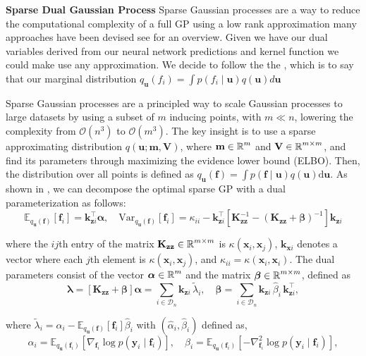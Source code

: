 \documentclass{article}
\newcommand{\mathbold}[1]{\bm{#1}}
\newcommand{\mbf}[1]{\mathbf{#1}}
\newcommand{\MV}{\mbf{V}}
\newcommand{\T}{\top}
\newcommand{\valpha}[0]{\mathbold{\alpha}}
\newcommand{\vbeta}[0]{\mathbold{\beta}}
\newcommand{\vlambda}[0]{\mathbold{\lambda}}
\newcommand{\vm}{\mbf{m}}
\newcommand{\vf}{\mbf{f}}
\newcommand{\vu}{\mbf{u}}
\newcommand{\vx}{\mbf{x}}
\newcommand{\vy}{\mbf{y}}
\newcommand{\MKzz}{\mbf{K}_{\mbf{z}\mbf{z}}}
\newcommand{\vkzi}{\mbf{k}_{\mbf{z}i}}
\newcommand{\vkzs}{\mbf{k}_{\mbf{z}i}}
\newcommand{\vk}{\mbf{k}}
\newcommand{\myexpect}{\mathbb{E}}
\begin{document}
\textbf{Sparse Dual Gaussian Process} Sparse Gaussian processes are a way to reduce the computational complexity of a full GP using a low rank approximation many approaches have been devised see \citet{quinonero2005unifying} for an overview. Given we have our dual variables derived from our neural network predictions and kernel function we could make use any approximation. We decide to follow the the \citep{titsias2009variational}, which is to say that our marginal distribution $q_{\vu}(f_i)  = \int p(f_i  \mid \vu) q(\vu)  d\vu$

Sparse Gaussian processes \citep{hensman2013gaussian} are a principled way to scale Gaussian processes to large datasets by using a subset of $m$ inducing points, with $m \ll n$,  lowering the complexity from $\mathcal{O}(n^3)$ to $\mathcal{O}(m^3)$. The key insight is to use a sparse approximating distribution $q(\vu; \vm, \MV)$, where $\vm \in \R^{m}$ and $\MV \in \R^{m \times m}$, and find its parameters through maximizing the evidence lower bound (ELBO). Then, the distribution over all points is defined as $q_{\vu}(\vf) = \int p(\vf \mid \vu) q(\vu) \mathrm{d}\vu$. As shown in \cite{adam2021dual}, we can decompose the optimal sparse GP  with a dual parameterization \cite{adam2021dual} as follows:
\begin{equation}
   \myexpect_{q_{\vu}(\vf)}[\vf_i] = \vkzs^{\T} \valpha , \quad 
   \textrm{Var}_{q_{\vu}(\vf)}[\vf_i]  = \kappa_{ii} - \vkzs^\top [\MKzz^{-1} - (\MKzz + \vbeta)^{-1} ]\vkzs
\end{equation}



where the $ij$th entry of the matrix $\MKzz \in \R^{m \times m}$ is $\kappa(\vx_i,\vx_j)$, $\vk_{\vx i}$\todo{the equation above uses $\vkzs$ not $\vk_{\vx i}$} denotes a vector where each $j$th element is $\kappa(\vx_i, \vx_j)$, and $\kappa_{ii} = \kappa(\vx_i, \vx_i)$.  The dual parameters consist of the vector $\valpha \in \R^{m}$ and the matrix $\vbeta \in \R^{m \times m}$, defined as
\begin{equation} 
	\vlambda = [ \MKzz + \vbeta] \valpha  = \sum_{i \in \mathcal{D}_{n}}  \vkzi \, \tilde{\lambda}_{i}, \quad
	\vbeta = \sum_{i \in \mathcal{D}_{n}} \vkzi \,\hat{\beta}_{i} \, \vkzi^{\T} ,    
\label{eq:dual_sparse}
\end{equation}

where $\tilde{\lambda}_i = \alpha_i - \myexpect_{q_{\vu}(\vf)}[\vf_i] \hat{\beta}_i$ with $(\hat{\alpha}_i, \hat{\beta}_i)$ defined as,
\begin{equation}
 \alpha_i = \myexpect_{q_{\vu}(\vf_i)} [\nabla_{\vf_i}\log p(\vy_i \mid \vf_i)], \quad
   \beta_i = \myexpect_{q_{\vu}(\vf_i)} [ -\nabla^{2}_{\vf_i}\log p(\vy_i \mid \vf_i)],
\label{eq:svgp_dual}
\end{equation}
\end{document}
